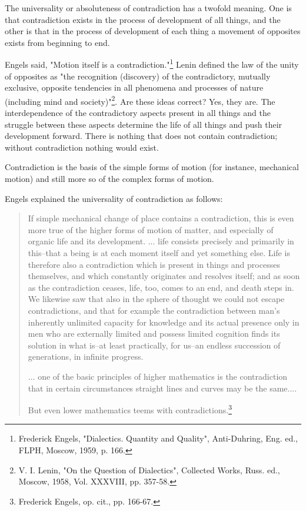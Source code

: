 \documentclass{article}
\begin{document}
The universality or absoluteness of contradiction has a twofold meaning. One is
that contradiction exists in the process of development of all things, and the
other is that in the process of development of each thing a movement of
opposites exists from beginning to end.

Engels said, "Motion itself is a contradiction."\footnote{Frederick Engels,
"Dialectics. Quantity and Quality", Anti-Duhring, Eng. ed., FLPH, Moscow, 1959,
p. 166.} Lenin defined the law of the unity of opposites as "the recognition
(discovery) of the contradictory, mutually exclusive, opposite tendencies in
all phenomena and processes of nature (including mind and society)"\footnote{V.
I. Lenin, "On the Question of Dialectics", Collected Works, Russ. ed., Moscow,
1958, Vol. XXXVIII, pp. 357-58.}. Are these ideas correct? Yes, they are. The
interdependence of the contradictory aspects present in all things and the
struggle between these aspects determine the life of all things and push their
development forward. There is nothing that does not contain contradiction;
without contradiction nothing would exist.

Contradiction is the basis of the simple forms of motion (for instance,
mechanical motion) and still more so of the complex forms of motion.

Engels explained the universality of contradiction as follows:

\begin{quote} 
If simple mechanical change of place contains a contradiction,
this is even more true of the higher forms of motion of matter, and especially
of organic life and its development. ... life consists precisely and primarily
in this--that a being is at each moment itself and yet something else. Life is
therefore also a contradiction which is present in things and processes
themselves, and which constantly originates and resolves itself; and as soon as
the contradiction ceases, life, too, comes to an end, and death steps in. We
likewise saw that also in the sphere of thought we could not escape
contradictions, and that for example the contradiction between man's inherently
unlimited capacity for knowledge and its actual presence only in men who are
externally limited and possess limited cognition finds its solution in what
is--at least practically, for us--an endless succession of generations, in
infinite progress.

... one of the basic principles of higher mathematics is the contradiction that in certain circumstances straight lines and curves may be the same....

But even lower mathematics teems with contradictions.\footnote{Frederick
Engels, op. cit., pp. 166-67.} 
\end{quote}
\end{document}
